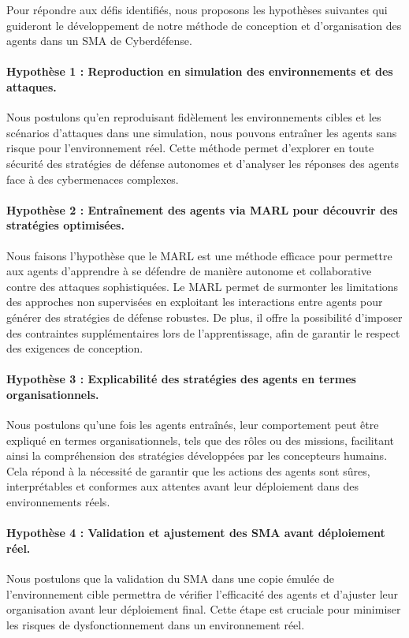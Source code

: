 Pour répondre aux défis identifiés, nous proposons les hypothèses suivantes qui guideront le développement de notre méthode de conception et d'organisation des agents dans un SMA de Cyberdéfense.

\paragraph{Hypothèse 1 : Reproduction en simulation des environnements et des attaques.}
Nous postulons qu'en reproduisant fidèlement les environnements cibles et les scénarios d'attaques dans une simulation, nous pouvons entraîner les agents sans risque pour l’environnement réel. Cette méthode permet d'explorer en toute sécurité des stratégies de défense autonomes et d'analyser les réponses des agents face à des cybermenaces complexes.

\paragraph{Hypothèse 2 : Entraînement des agents via MARL pour découvrir des stratégies optimisées.}
Nous faisons l'hypothèse que le MARL est une méthode efficace pour permettre aux agents d’apprendre à se défendre de manière autonome et collaborative contre des attaques sophistiquées. Le MARL permet de surmonter les limitations des approches non supervisées en exploitant les interactions entre agents pour générer des stratégies de défense robustes. De plus, il offre la possibilité d’imposer des contraintes supplémentaires lors de l'apprentissage, afin de garantir le respect des exigences de conception.

\paragraph{Hypothèse 3 : Explicabilité des stratégies des agents en termes organisationnels.}
Nous postulons qu'une fois les agents entraînés, leur comportement peut être expliqué en termes organisationnels, tels que des rôles ou des missions, facilitant ainsi la compréhension des stratégies développées par les concepteurs humains. Cela répond à la nécessité de garantir que les actions des agents sont sûres, interprétables et conformes aux attentes avant leur déploiement dans des environnements réels.

\paragraph{Hypothèse 4 : Validation et ajustement des SMA avant déploiement réel.}
Nous postulons que la validation du SMA dans une copie émulée de l’environnement cible permettra de vérifier l'efficacité des agents et d'ajuster leur organisation avant leur déploiement final. Cette étape est cruciale pour minimiser les risques de dysfonctionnement dans un environnement réel.

